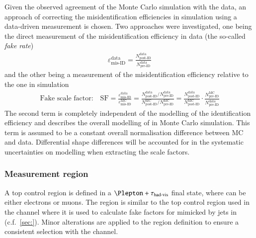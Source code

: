 Given the observed agreement of the Monte Carlo simulation with the
data, an approach of correcting the misidentification efficiencies in
simulation using a data-driven measurement is chosen. Two approaches
were investigated, one being the direct measurement of the
misidentification efficiency in data (the so-called \textit{fake
  rate})
\begin{align*}
  \varepsilon_\text{mis-ID}^\text{data} = \frac{N_\text{post-ID}^\text{data}}{N_\text{pre-ID}^\text{data}}
\end{align*}
and the other being a measurement of the misidentification efficiency
relative to the one in simulation
\begin{align*}
  \text{Fake scale factor:}\quad
  \text{SF} =
  \frac{\varepsilon_\text{mis-ID}^\text{data}}{\varepsilon_\text{mis-ID}^\text{MC}} =
  \frac{N_\text{post-ID}^\text{data} / N_\text{pre-ID}^\text{data}}{N_\text{post-ID}^\text{MC} / N_\text{pre-ID}^\text{MC}}
  = \frac{N_\text{post-ID}^\text{data}}{N_\text{post-ID}^\text{MC}} \cdot \frac{N_\text{pre-ID}^\text{MC}}{N_\text{pre-ID}^\text{data}}
\end{align*}
The second term is completely independent of the modelling of the
\tauhadvis identification efficiency and describes the overall
modelling of \ttbar in Monte Carlo simulation. This term is assumed to
be a constant overall normalisation difference between MC and
data. Differential shape differences will be accounted for in the
systematic uncertainties on \ttbar modelling when extracting the scale
factors.




\subsubsection{Measurement region}

A top control region is defined in a $\Plepton + \tauhadvis$ final
state, where \Plepton can be either electrons or muons. The region is
similar to the top control region used in the \lephad channel where it
is used to calculate fake factors for \tauhadvis mimicked by jets in
\ttbar (c.f.\ \cref{sec:}). Minor alterations are applied to the
region definition to ensure a consistent \tauhadvis selection with the
\hadhad channel.

